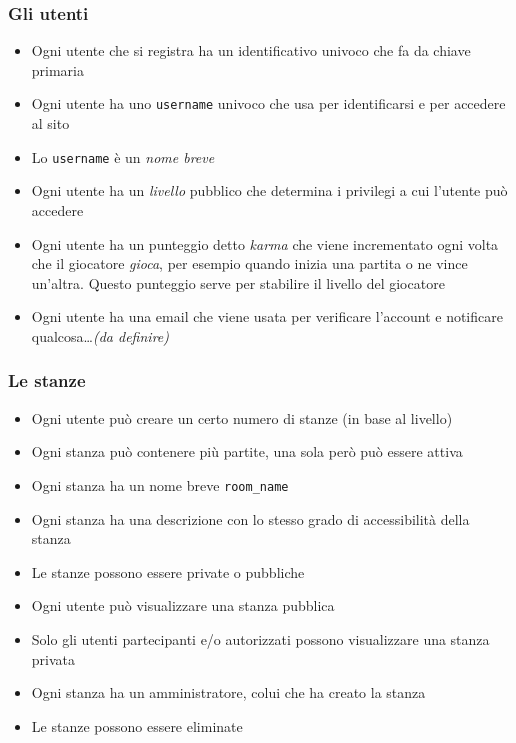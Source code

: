 \documentclass[10pt,a4paper]{article}
\begin{document}
\subsubsection{Gli utenti}
\begin{itemize}
\item Ogni utente che si registra ha un identificativo univoco che fa da chiave primaria
\item Ogni utente ha uno \texttt{username} univoco che usa per identificarsi e per accedere al sito
\item Lo \texttt{username} è un \emph{nome breve}
\item Ogni utente ha un \emph{livello} pubblico che determina i privilegi a cui l'utente può accedere
\item Ogni utente ha un punteggio detto \emph{karma} che viene incrementato ogni volta che il giocatore \emph{gioca}, per esempio quando inizia una partita o ne vince un'altra. Questo punteggio serve per stabilire il livello del giocatore
\item Ogni utente ha una email che viene usata per verificare l'account e notificare qualcosa\dots \emph{(da definire)}
\end{itemize}

\subsubsection{Le stanze}
\begin{itemize}
\item Ogni utente può creare un certo numero di stanze (in base al livello)
\item Ogni stanza può contenere più partite, una sola però può essere attiva
\item Ogni stanza ha un nome breve \texttt{room\_name}
\item Ogni stanza ha una descrizione con lo stesso grado di accessibilità della stanza
\item Le stanze possono essere private o pubbliche
\item Ogni utente può visualizzare una stanza pubblica
\item Solo gli utenti partecipanti e/o autorizzati possono visualizzare una stanza privata
\item Ogni stanza ha un amministratore, colui che ha creato la stanza
\item Le stanze possono essere eliminate
\end{itemize}
\end{document}
